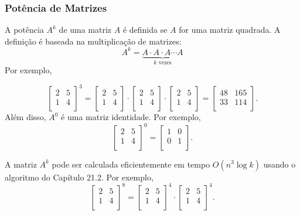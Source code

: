 \subsubsection{Potência de Matrizes}


A potência $A^k$ de uma matriz $A$ é definida
se $A$ for uma matriz quadrada.
A definição é baseada na multiplicação de matrizes:
\[ A^k = \underbrace{A \cdot A \cdot A \cdots A}_{\textrm{$k$ vezes}} \]
Por exemplo,

\[
 \begin{bmatrix}
  2 & 5 \\
  1 & 4 \\
 \end{bmatrix}^3 =
 \begin{bmatrix}
  2 & 5 \\
  1 & 4 \\
 \end{bmatrix} \cdot
 \begin{bmatrix}
  2 & 5 \\
  1 & 4 \\
 \end{bmatrix} \cdot
 \begin{bmatrix}
  2 & 5 \\
  1 & 4 \\
 \end{bmatrix} =
 \begin{bmatrix}
  48 & 165 \\
  33 & 114 \\
 \end{bmatrix}.
\]
Além disso, $A^0$ é uma matriz identidade. Por exemplo,
\[
 \begin{bmatrix}
  2 & 5 \\
  1 & 4 \\
 \end{bmatrix}^0 =
 \begin{bmatrix}
  1 & 0 \\
  0 & 1 \\
 \end{bmatrix}.
\]

A matriz $A^k$ pode ser calculada eficientemente
em tempo $O(n^3 \log k)$ usando o
algoritmo do Capítulo 21.2. Por exemplo,
\[
 \begin{bmatrix}
  2 & 5 \\
  1 & 4 \\
 \end{bmatrix}^8 =
 \begin{bmatrix}
  2 & 5 \\
  1 & 4 \\
 \end{bmatrix}^4 \cdot
 \begin{bmatrix}
  2 & 5 \\
  1 & 4 \\
 \end{bmatrix}^4.
\]

